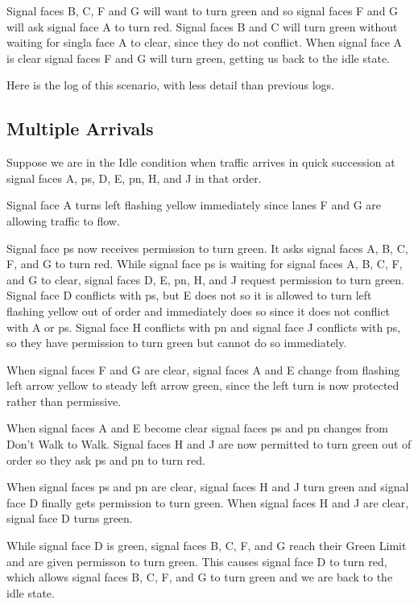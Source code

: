 \documentclass[letterpaper,twoside]{article}
\begin{document}
Signal faces B, C, F and G will want to turn green and so signal faces
F and G will ask signal face A to turn red.  Signal faces B and C
will turn green without waiting for singla face A to clear, since
they do not conflict.  When signal face A is clear signal faces
F and G will turn green, getting us back to the idle state.

Here is the log of this scenario, with less detail than previous
logs.



\subsection{Multiple Arrivals}

Suppose we are in the Idle condition when traffic arrives in quick succession
at signal faces A, ps, D, E, pn, H, and J in that order.

Signal face A turns left flashing yellow immediately since lanes
F and G are allowing traffic to flow.

Signal face ps now receives permission to turn green.  It asks
signal faces A, B, C, F, and G to turn red.
While signal face ps is waiting for signal faces A, B, C, F, and G to clear,
signal faces D, E, pn, H, and J request permission to turn green.
Signal face D conflicts with ps, but E does not so it is allowed to
turn left flashing yellow out of order and immediately does so
since it does not conflict with A or ps.  Signal face H conflicts
with pn and signal face J conflicts with ps, so they have permission
to turn green but cannot do so immediately.

When signal faces F and G are clear, signal faces A and E change from flashing
left arrow yellow to steady left arrow green, since the left turn is now
protected rather than permissive.

When signal faces A and E become clear signal faces ps and pn changes from
Don't Walk to Walk.  Signal faces H and J are now permitted to turn green
out of order so they ask ps and pn to turn red.

When signal faces ps and pn are clear, signal faces H and J turn green
and signal face D finally gets permission to turn green.  When signal faces
H and J are clear, signal face D turns green.

While signal face D is green, signal faces B, C, F, and G reach their
Green Limit and are given permisson to turn green.  This causes signal
face D to turn red, which allows signal faces B, C, F, and G to turn green
and we are back to the idle state.
\end{document}
